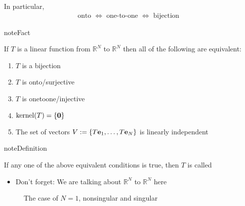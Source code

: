 \documentclass[letterpaper,10pt,english]{jupyterBook}
\begin{document}
\sphinxAtStartPar
In particular,
\begin{equation*}
\begin{split}
%
\text{onto } \iff \text{ one-to-one } \iff \text{ bijection}
%
\end{split}
\end{equation*}
\begin{sphinxadmonition}{note}{Fact}

\sphinxAtStartPar
If \(T\) is a linear function from \(\mathbb{R}^N\) to \(\mathbb{R}^N\) then all of the following are equivalent:
\begin{enumerate}
%
\item {} 
\sphinxAtStartPar
\(T\) is a bijection

\item {} 
\sphinxAtStartPar
\(T\) is onto/surjective

\item {} 
\sphinxAtStartPar
\(T\) is one\sphinxhyphen{}to\sphinxhyphen{}one/injective

\item {} 
\sphinxAtStartPar
\(\mathrm{kernel}(T) = \{ {\bf 0} \}\)

\item {} 
\sphinxAtStartPar
The set of vectors \(V := \{T{\bf e}_1, \ldots, T{\bf e}_N\}\) is linearly independent

\end{enumerate}
\end{sphinxadmonition}

\begin{sphinxadmonition}{note}{Definition}

\sphinxAtStartPar
If any one of the above equivalent conditions is true, then \(T\) is called 
\end{sphinxadmonition}
\begin{itemize}
\item {} 
\sphinxAtStartPar
Don’t forget: We are talking about \(\mathbb{R}^N\) to \(\mathbb{R}^N\) here

\end{itemize}

\begin{figure}[htbp]
\centering
\capstart

\noindent{}
\caption{The case of \(N=1\), nonsingular and singular}\label{\detokenize{05.linear_algebra:id13}}\end{figure}
\end{document}
